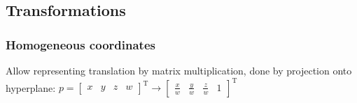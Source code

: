 \documentclass[a4paper,10pt]{article}
\begin{document}
\subsection{Transformations}
\subsubsection{Homogeneous coordinates}
Allow representing translation by matrix multiplication, done by projection onto hyperplane: \( p = \left[\begin{smallmatrix}x & y & z & w\end{smallmatrix}\right]^\mathrm{T} \to \left[\begin{smallmatrix}\frac{x}{w} & \frac{y}{w} & \frac{z}{w} & 1\end{smallmatrix}\right]^\mathrm{T} \)
\end{document}
